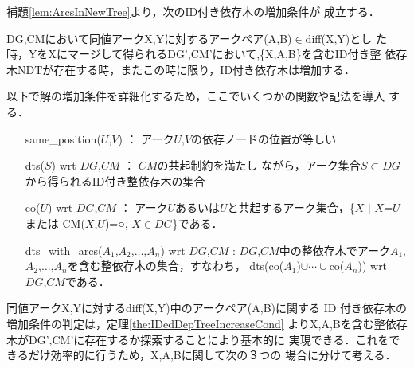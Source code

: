 {\mynoindent}補題\ref{lem:ArcsInNewTree}より，次のID付き依存木の増加条件が
成立する．

\begin{theorem}[ID付き依存木の増加条件]
\label{the:IDedDepTreeIncreaseCond}
DG,CMにおいて同値アークX,Yに対するアークペア(A,B)${\in}$diff(X,Y)とし
た時，YをXにマージして得られるDG',CM'において,\{X,A,B\}を含むID付き整
依存木NDTが存在する時，またこの時に限り，ID付き依存木は増加する．

\end{theorem}

{\mynoindent}以下で解の増加条件を詳細化するため，ここでいくつかの関数や記法を導入
する．

\myhalfskip
\hspace{-5mm}
\fbox
{
 \begin{minipage}{13.7cm}

\begin{itemize}
\item[\myitemindent same\_position($U$,$V$)] ： アーク$U$,$V$の依存ノードの位置が等しい
\item[\myitemindent dts($S$) wrt $DG$,$CM$] ： $CM$の共起制約を満たし
ながら，アーク集合$S{\subset}DG$から得られるID付き整依存木の集合
\item[\myitemindent co($U$) wrt $DG$,$CM$] ： アーク$U$あるいは$U$と共起するアーク集合，\{$X$ ${\mid}$ $X$=$U$ または CM($X$,$U$)=○, $X{\in}DG$\}である．
\item[\myitemindent dts\_with\_arcs($A_1$,$A_2$,${\ldots}$,$A_n$) wrt $DG$,$CM$] :
$DG$,$CM$中の整依存木でアーク$A_1$,$A_2$,${\ldots}$,$A_n$を含む整依存木の集合，すなわち，
dts(co($A_1$)${\cup}{\cdots}{\cup}$co($A_n$)) wrt $DG$,$CM$である．
\end{itemize}
\myhalfskip
\end{minipage}
}
\myhalfskip

{\mynoindent}同値アークX,Yに対するdiff(X,Y)中のアークペア(A,B)に関する
ID 付き依存木の増加条件の判定は，定理\ref{the:IDedDepTreeIncreaseCond}
よりX,A,Bを含む整依存木がDG',CM'に存在するか探索することにより基本的に
実現できる．これをできるだけ効率的に行うため，X,A,Bに関して次の３つの
場合に分けて考える．

